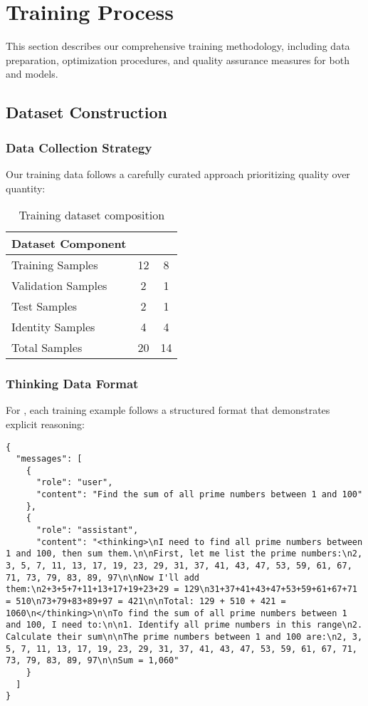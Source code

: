 \section{Training Process}
\label{sec:training}

This section describes our comprehensive training methodology, including data preparation, optimization procedures, and quality assurance measures for both \supra{} and \zennano{} models.

\subsection{Dataset Construction}

\subsubsection{Data Collection Strategy}

Our training data follows a carefully curated approach prioritizing quality over quantity:

\begin{table}[H]
\centering
\begin{tabular}{lcc}
\toprule
Dataset Component & \supra{} & \zennano{} \\
\midrule
Training Samples & 12 & 8 \\
Validation Samples & 2 & 1 \\
Test Samples & 2 & 1 \\
Identity Samples & 4 & 4 \\
Total Samples & 20 & 14 \\
\bottomrule
\end{tabular}
\caption{Training dataset composition}
\label{tab:dataset-composition}
\end{table}

\subsubsection{Thinking Data Format}

For \supra{}, each training example follows a structured format that demonstrates explicit reasoning:

\begin{lstlisting}[caption=Structured thinking example,label=lst:thinking-format]
{
  "messages": [
    {
      "role": "user", 
      "content": "Find the sum of all prime numbers between 1 and 100"
    },
    {
      "role": "assistant", 
      "content": "<thinking>\nI need to find all prime numbers between 1 and 100, then sum them.\n\nFirst, let me list the prime numbers:\n2, 3, 5, 7, 11, 13, 17, 19, 23, 29, 31, 37, 41, 43, 47, 53, 59, 61, 67, 71, 73, 79, 83, 89, 97\n\nNow I'll add them:\n2+3+5+7+11+13+17+19+23+29 = 129\n31+37+41+43+47+53+59+61+67+71 = 510\n73+79+83+89+97 = 421\n\nTotal: 129 + 510 + 421 = 1060\n</thinking>\n\nTo find the sum of all prime numbers between 1 and 100, I need to:\n\n1. Identify all prime numbers in this range\n2. Calculate their sum\n\nThe prime numbers between 1 and 100 are:\n2, 3, 5, 7, 11, 13, 17, 19, 23, 29, 31, 37, 41, 43, 47, 53, 59, 61, 67, 71, 73, 79, 83, 89, 97\n\nSum = 1,060"
    }
  ]
}
\end{lstlisting}

